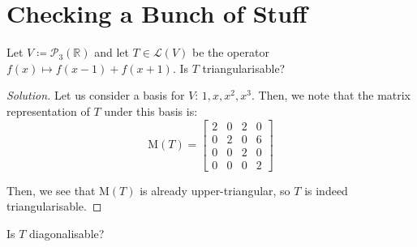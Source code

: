 \documentclass{article}
\newenvironment{solution}{\begin{proof}[Solution]}{\end{proof}}
\newcommand{\RR}{\mathbb{R}}
\begin{document}
	\section{Checking a Bunch of Stuff}
	\begin{hw}
		Let $V \coloneq \mathscr{P}_{3}(\RR)$ and let $T \in \mathcal{L}(V)$ be the operator $f(x) \mapsto f(x-1) + f(x+1)$. Is $T$ triangularisable?
	\end{hw}
	\begin{solution}
		Let us consider a basis for $V$: $1, x, x^{2}, x^{3}$. Then, we note that the matrix representation of $T$ under this basis is:
		\begin{equation*}
			\mathrm{M}(T) = 
			\begin{bmatrix}
				2 & 0 & 2 & 0 \\
				0 & 2 & 0 & 6 \\
				0 & 0 & 2 & 0 \\
				0 & 0 & 0 & 2
			\end{bmatrix}
		\end{equation*}
	
		Then, we see that $\mathrm{M}(T)$ is already upper-triangular, so $T$ is indeed triangularisable.
	\end{solution}
	\begin{hw}
		Is $T$ diagonalisable?
	\end{hw}
\end{document}
